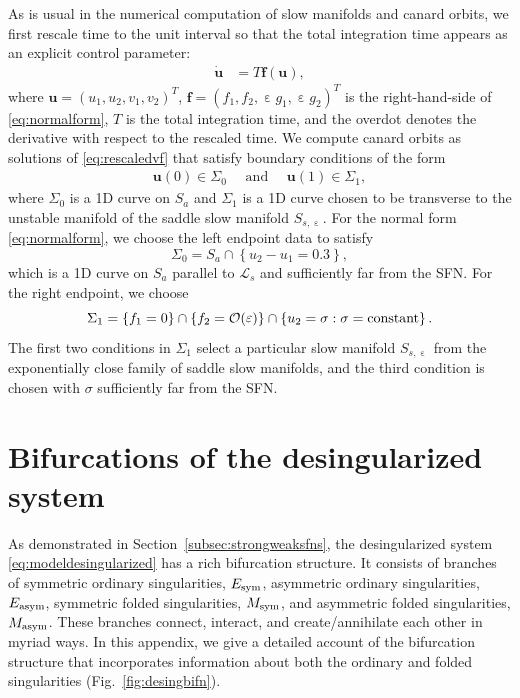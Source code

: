 \documentclass[10pt,onecolumn]{article}
\theoremstyle{plain}
\DeclareMathOperator{\eps}{\varepsilon}
\begin{document}
As is usual in the numerical computation of slow manifolds and canard orbits, we first rescale time to the unit interval so that the total integration time appears as an explicit control parameter: 
%
\begin{equation} \label{eq:rescaledvf}
  \begin{split}
    \dot{\boldsymbol u} &= T \boldsymbol f (\boldsymbol u),
  \end{split}
\end{equation}
%
where $\boldsymbol u = (u_1,u_2,v_1,v_2)^T$, $\boldsymbol f = (f_1,f_2,\eps g_1, \eps g_2)^T$ is the right-hand-side of \eqref{eq:normalform}, $T$ is the total integration time, and the overdot denotes the derivative with respect to the rescaled time. 
We compute canard orbits as solutions of \eqref{eq:rescaledvf} that satisfy boundary conditions of the form
%
\begin{equation*}
  \begin{split}
    \boldsymbol u(0) \in \Sigma_0 \quad \text{ and } \quad \boldsymbol u(1) \in \Sigma_1,
  \end{split}
\end{equation*}
%
where $\Sigma_0$ is a 1D curve on $S_a$ and $\Sigma_1$ is a 1D curve chosen to be transverse to the unstable manifold of the saddle slow manifold $S_{s,\eps}$. For the normal form \eqref{eq:normalform}, we choose the left endpoint data to satisfy
%
\[ \Sigma_0 = S_a \cap \left\{ u_2-u_1 = 0.3 \right\}, \]
%
which is a 1D curve on $S_a$ parallel to $\mathcal L_s$ and sufficiently far from the SFN. For the right endpoint, we choose 
%
\[ \Sigma_1 = \left\{ f_1 = 0 \right\} \cap \left\{ f_2 = \mathcal O(\eps) \right\} \cap \left\{ u_2 = \sigma : \sigma = {\rm constant} \right\}. \]
% 
The first two conditions in $\Sigma_1$ select a particular slow manifold $S_{s,\eps}$ from the exponentially close family of saddle slow manifolds, and the third condition is chosen with $\sigma$ sufficiently far from the SFN.


\section{Bifurcations of the desingularized system} \label{subsec:desingbifn}
As demonstrated in Section~\ref{subsec:strongweaksfns}, the desingularized system \eqref{eq:modeldesingularized} has a rich bifurcation structure. It consists of branches of symmetric ordinary singularities, $E_{\rm sym}$, asymmetric ordinary singularities, $E_{\rm asym}$, symmetric folded singularities, $M_{\rm sym}$, and asymmetric folded singularities, $M_{\rm asym}$. These branches connect, interact, and create/annihilate each other in myriad ways. In this appendix, we give a detailed account of the bifurcation structure that incorporates information about both the ordinary and folded singularities (Fig.~\ref{fig:desingbifn}).
\end{document}
